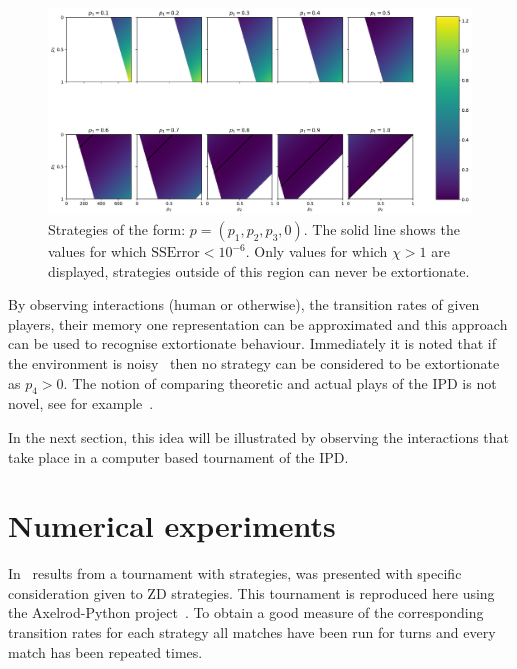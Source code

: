 \documentclass[a4paper]{article}
\begin{document}
\begin{figure}[!htbp]
    \begin{center}
        \includegraphics[width=\textwidth]{assets/img/examples_of_extortion/main.pdf}
        \caption{Strategies of the form:
                 \(p=(p_1, p_2, p_3, 0)\). The solid line shows the values for
                 which \(\text{SSError} < 10 ^ {-6}\). Only values for which \(\chi > 1\) are
                 displayed, strategies outside of this region can never be
                 extortionate.}
        \label{fig:examples_of_extortion}
    \end{center}
\end{figure}

By observing interactions (human or otherwise), the transition rates of given
players, their memory one representation can be approximated and this approach
can be used to recognise extortionate behaviour. Immediately it is noted that if
the environment is noisy~\cite{Wu1995} then no strategy can be considered to be
extortionate as \(p_4>0\). The notion of comparing theoretic and actual plays of
the IPD is not novel, see for example~\cite{Rand2013}.

In the next section, this idea will be illustrated by observing the interactions
that take place in a computer based tournament of the IPD\@.

\section{Numerical experiments}\label{sec:numerical-experiments}

In~\cite{Stewart2012} results from a tournament with
 strategies,
was presented with specific consideration given to ZD strategies. This
tournament is reproduced here using the Axelrod-Python
project~\cite{Knight2016}. To obtain a good measure of the corresponding
transition rates for each strategy all matches have been run for
 turns and every match has been
repeated  times.
\end{document}
